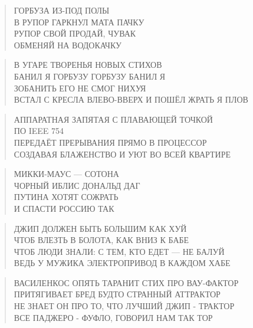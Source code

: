 \poemtitle{***}
\begin{verse}
ГОРБУЗА ИЗ-ПОД ПОЛЫ \\
В РУПОР ГАРКНУЛ МАТА ПАЧКУ\\
РУПОР СВОЙ ПРОДАЙ, ЧУВАК\\
ОБМЕНЯЙ НА ВОДОКАЧКУ
\end{verse}

\poemtitle{***}
\begin{verse}
В УГАРЕ ТВОРЕНЬЯ НОВЫХ СТИХОВ\\
БАНИЛ Я ГОРБУЗУ ГОРБУЗУ БАНИЛ Я\\
ЗОБАНИТЬ ЕГО НЕ СМОГ НИХУЯ\\
ВСТАЛ С КРЕСЛА ВЛЕВО-ВВЕРХ И ПОШЁЛ ЖРАТЬ Я ПЛОВ
\end{verse}

\poemtitle{***}
\begin{verse}
АППАРАТНАЯ ЗАПЯТАЯ С ПЛАВАЮЩЕЙ ТОЧКОЙ\\
ПО IEEE 754\\
ПЕРЕДАЁТ ПРЕРЫВАНИЯ ПРЯМО В ПРОЦЕССОР\\
СОЗДАВАЯ БЛАЖЕНСТВО И УЮТ ВО ВСЕЙ КВАРТИРЕ
\end{verse}

\poemtitle{***}
\begin{verse}
МИККИ-МАУС — СОТОНА\\
ЧОРНЫЙ ИБЛИС ДОНАЛЬД ДАГ\\
ПУТИНА ХОТЯТ СОЖРАТЬ\\
И СПАСТИ РОССИЮ ТАК
\end{verse}

\poemtitle{***}
\begin{verse}
ДЖИП ДОЛЖЕН БЫТЬ БОЛЬШИМ КАК ХУЙ\\
ЧТОБ ВЛЕЗТЬ В БОЛОТА, КАК ВНИЗ К БАБЕ\\
ЧТОБ ЛЮДИ ЗНАЛИ: С ТЕМ, КТО ЕДЕТ — НЕ БАЛУЙ\\
ВЕДЬ У МУЖИКА ЭЛЕКТРОПРИВОД В КАЖДОМ ХАБЕ
\end{verse}

\poemtitle{***}
\begin{verse}
ВАСИЛЕНКОС ОПЯТЬ ТАРАНИТ СТИХ ПРО ВАУ-ФАКТОР\\
ПРИТЯГИВАЕТ БРЕД БУДТО СТРАННЫЙ АТТРАКТОР\\
НЕ ЗНАЕТ ОН ПРО ТО, ЧТО ЛУЧШИЙ ДЖИП - ТРАКТОР\\
ВСЕ ПАДЖЕРО - ФУФЛО, ГОВОРИЛ НАМ ТАК ТОР
\end{verse}

